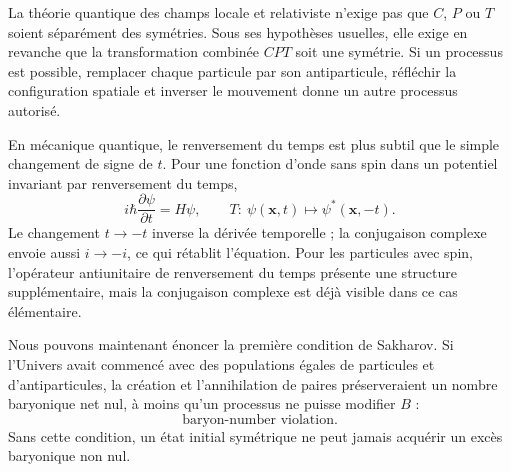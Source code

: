 La théorie quantique des champs locale et relativiste n’exige pas que \(C\), \(P\) ou \(T\) soient séparément des symétries. Sous ses hypothèses usuelles, elle exige en revanche que la transformation combinée \(CPT\) soit une symétrie. Si un processus est possible, remplacer chaque particule par son antiparticule, réfléchir la configuration spatiale et inverser le mouvement donne un autre processus autorisé.

En mécanique quantique, le renversement du temps est plus subtil que le simple changement de signe de \(t\). Pour une fonction d’onde sans spin dans un potentiel invariant par renversement du temps,
\begin{equation}
i\hbar\frac{\partial\psi}{\partial t}=H\psi,
\qquad
T:\ \psi(\mathbf x,t)\longmapsto\psi^*(\mathbf x,-t).
\end{equation}
Le changement \(t\to-t\) inverse la dérivée temporelle ; la conjugaison complexe envoie aussi \(i\to-i\), ce qui rétablit l’équation. Pour les particules avec spin, l’opérateur antiunitaire de renversement du temps présente une structure supplémentaire, mais la conjugaison complexe est déjà visible dans ce cas élémentaire.

\begin{classroomqa}
\end{classroomqa}

Nous pouvons maintenant énoncer la première condition de Sakharov. Si l’Univers avait commencé avec des populations égales de particules et d’antiparticules, la création et l’annihilation de paires préserveraient un nombre baryonique net nul, à moins qu’un processus ne puisse modifier \(B\) :
\begin{equation}
\boxed{\text{baryon-number violation}.}
\end{equation}
Sans cette condition, un état initial symétrique ne peut jamais acquérir un excès baryonique non nul.

